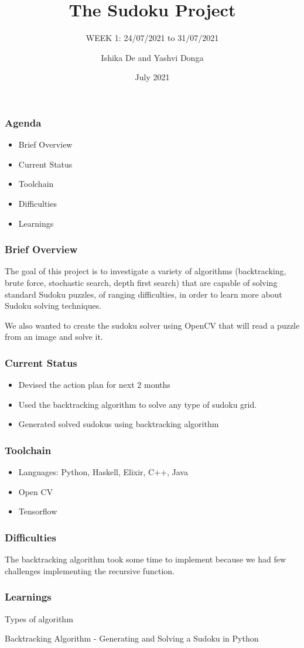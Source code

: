 \documentclass{beamer}
\title{The Sudoku Project}
\subtitle{WEEK 1: 24/07/2021 to 31/07/2021}
\author[Ishika | Yashvi]{Ishika De and Yashvi Donga}
\date{July 2021}
\begin{document}
\begin{frame}
     \titlepage
\end{frame}
\begin{frame}
     \frametitle{Agenda}
     \begin{itemize}
          \item Brief Overview
          \item Current Status
          \item Toolchain
          \item Difficulties
          \item Learnings
     \end{itemize}
\end{frame}

\begin{frame}
     \frametitle{Brief Overview}
     The goal of this project is to investigate a variety of algorithms (backtracking, brute force, stochastic search, depth first search) that are capable of solving
standard Sudoku puzzles, of ranging difficulties, in order to learn more about Sudoku
solving techniques.\newline

     We also wanted to create the sudoku solver using OpenCV that will read a puzzle from an image and solve it.
\end{frame}
\begin{frame}
     \frametitle{Current Status}   
     \begin{itemize}
          \item Devised the action plan for next 2 months
          \item Used the backtracking algorithm to solve any type of sudoku grid.
          \item Generated solved sudokus using backtracking algorithm
     \end{itemize}
\end{frame}


\begin{frame}
     \frametitle{Toolchain}
     \begin{itemize}
          \item Languages: Python, Haskell, Elixir, C++, Java
          \item Open CV
          \item Tensorflow
     \end{itemize}
\end{frame}

\begin{frame}
     \frametitle{Difficulties}
     The backtracking algorithm took some time to implement because we had few challenges implementing the recursive function.
\end{frame}

\begin{frame}
     \frametitle{Learnings}
     \item Types of algorithm
     \item Backtracking Algorithm -  Generating and Solving a Sudoku in Python
\end{frame}
\end{document}
